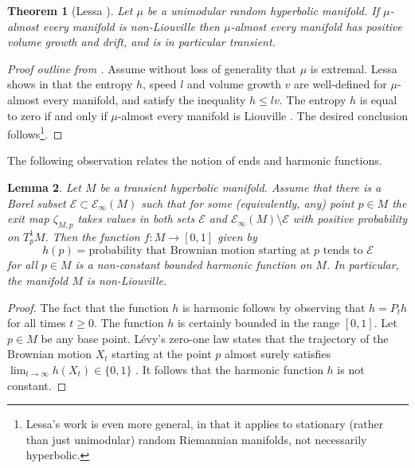 \documentclass{amsart}
\newcommand{\EndsInf}[1]{\mathcal{E}_{\infty}\left(#1\right)}
\theoremstyle{plain}
\newtheorem{theorem}{Theorem}[section]
\newtheorem{lemma}[theorem]{Lemma}
\numberwithin{equation}{section}
\theoremstyle{definition}
\begin{document}
\begin{theorem}[{Lessa \cite{lessa2016brownian}}]
\label{theorem:Lessa}
Let $\mu$ be a unimodular random hyperbolic manifold. If $\mu$-almost every manifold is non-Liouville then $\mu$-almost every manifold has positive volume growth and drift, and is in particular transient.
\end{theorem}
\begin{proof}[Proof outline from \cite{lessa2016brownian}]
Assume without loss of generality that $\mu$ is extremal. Lessa shows in \cite[Theorem 2.15]{lessa2016brownian} that the entropy $h$, speed $l$ and volume growth $v$ are well-defined  for $\mu$-almost every manifold, and satisfy the inequality $h \le lv$. The entropy $h$ is equal to zero if and only if $\mu$-almost every manifold is Liouville \cite[Theorem 2.11]{lessa2016brownian}. The desired conclusion follows\footnote{Lessa's work \cite{lessa2016brownian} is even more general, in that it applies to stationary (rather than just unimodular) random Riemannian manifolds, not necessarily hyperbolic.}.
\end{proof}

The following observation relates the notion of ends and harmonic functions.

\begin{lemma}
\label{lem:ends and Liouville}
Let $M$ be a transient hyperbolic manifold.
Assume that there is a Borel subset $\mathcal{E} \subset \EndsInf{M} $ such that for some (equivalently, any) point $p\in M$ the exit map $\zeta_{M,p}$ takes values in both sets $\mathcal{E}$ and $\EndsInf{M}\setminus \mathcal{E}$ with positive probability on $T^1_p M$. Then the function $f : M \to \left[0,1\right]$ given by
$$h(p) = \textrm{probability that Brownian motion starting at $p$ tends to $\mathcal{E}$}$$
for all $p \in M$
is a non-constant bounded harmonic function on $M$. In particular, the manifold $M$ is non-Liouville.
\end{lemma}
\begin{proof}
The fact that the function $h$ is harmonic follows by observing that $h = P_th$ for all times $t \ge 0 $. The function $h$ is certainly bounded in the range $\left[0,1\right]$. Let $p \in M$ be any base point. L\'evy's zero-one law states that the trajectory of the Brownian motion $X_t$ starting at the point $p$ almost surely satisfies $\lim_{t\to\infty}h(X_t) \in \{0,1\}$  \cite[Theorems 3.19 and 3.21]{LeGall2016}. It follows that the harmonic function $h$ is not constant.
\end{proof}
\end{document}
